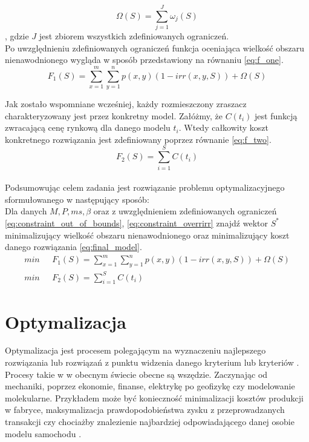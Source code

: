 \documentclass[twoside]{iisthesis}
\begin{document}
\begin{equation}\label{eq:constraint_sum}
	\Omega(S) = \sum_{j = 1}^{J} \omega_{j}(S)
\end{equation}
, gdzie $J$ jest zbiorem wszystkich zdefiniowanych ograniczeń.\\

Po uwzględnieniu zdefiniowanych ograniczeń funkcja oceniająca wielkość obszaru nienawodnionego wygląda w sposób przedstawiony na równaniu \eqref{eq:f_one}.
\begin{equation}\label{eq:f_one}
F_{1}(S) = \sum_{x=1}^{m}\sum_{y=1}^{n} p(x,y)(1 - irr(x,y,S)) + \Omega(S)
\end{equation}

Jak zostało wspomniane wcześniej, każdy rozmieszczony zraszacz charakteryzowany jest przez konkretny model. Załóżmy, że $C(t_{i})$ jest funkcją zwracającą cenę rynkową dla danego modelu $t_i$. Wtedy całkowity koszt konkretnego rozwiązania jest zdefiniowany poprzez równanie \eqref{eq:f_two}.
\begin{equation}\label{eq:f_two}
	F_{2}(S) = \sum_{i=1}^{S} C(t_{i})
\end{equation}\\

Podsumowując celem zadania jest rozwiązanie problemu optymalizacyjnego sformułowanego w następujący sposób:\\

Dla danych $M, P, ms, \beta$ oraz z uwzględnieniem zdefiniowanych ograniczeń \eqref{eq:constraint_out_of_bounds}, \eqref{eq:constraint_overrirr} znajdź wektor $S^{*}$ minimalizujący wielkość obszaru nienawodnionego oraz minimalizujący koszt danego rozwiązania \eqref{eq:final_model}.
\begin{equation}\label{eq:final_model}
	\begin{split}
		min \text{  }&  F_{1}(S) = \sum_{x=1}^{m}\sum_{y=1}^{n} p(x,y) (1 - irr(x,y,S)) + \Omega(S)\\
		min \text{  }&	F_{2}(S) = \sum_{i=1}^{S} C(t_{i})
	\end{split}
\end{equation}

\chapter{Optymalizacja}
Optymalizacja jest procesem polegającym na wyznaczeniu najlepszego rozwiązania lub rozwiązań z punktu widzenia danego kryterium lub kryteriów \cite{wiki_optimization}. Procesy takie w w obecnym świecie obecne są wszędzie. Zaczynając od mechaniki, poprzez ekonomie, finanse, elektrykę po geofizykę czy modelowanie molekularne. Przykładem może być konieczność minimalizacji kosztów produkcji w fabryce, maksymalizacja prawdopodobieństwa zysku z przeprowadzanych transakcji czy chociażby znalezienie najbardziej odpowiadającego danej osobie modelu samochodu \cite{wiki_pl_optimization}.
\end{document}
